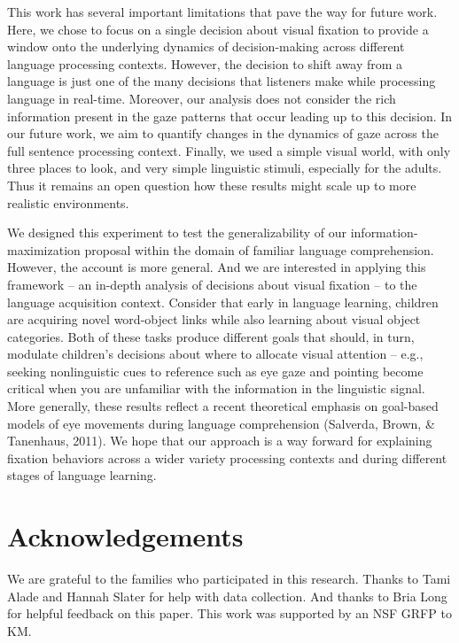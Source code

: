 \documentclass[10pt, letterpaper]{article}
\begin{document}
This work has several important limitations that pave the way for future
work. Here, we chose to focus on a single decision about visual fixation
to provide a window onto the underlying dynamics of decision-making
across different language processing contexts. However, the decision to
shift away from a language is just one of the many decisions that
listeners make while processing language in real-time. Moreover, our
analysis does not consider the rich information present in the gaze
patterns that occur leading up to this decision. In our future work, we
aim to quantify changes in the dynamics of gaze across the full sentence
processing context. Finally, we used a simple visual world, with only
three places to look, and very simple linguistic stimuli, especially for
the adults. Thus it remains an open question how these results might
scale up to more realistic environments.

We designed this experiment to test the generalizability of our
information-maximization proposal within the domain of familiar language
comprehension. However, the account is more general. And we are
interested in applying this framework -- an in-depth analysis of
decisions about visual fixation -- to the language acquisition context.
Consider that early in language learning, children are acquiring novel
word-object links while also learning about visual object categories.
Both of these tasks produce different goals that should, in turn,
modulate children's decisions about where to allocate visual attention
-- e.g., seeking nonlinguistic cues to reference such as eye gaze and
pointing become critical when you are unfamiliar with the information in
the linguistic signal. More generally, these results reflect a recent
theoretical emphasis on goal-based models of eye movements during
language comprehension (Salverda, Brown, \& Tanenhaus, 2011). We hope
that our approach is a way forward for explaining fixation behaviors
across a wider variety processing contexts and during different stages
of language learning.

\section{Acknowledgements}\label{acknowledgements}

We are grateful to the families who participated in this research.
Thanks to Tami Alade and Hannah Slater for help with data collection.
And thanks to Bria Long for helpful feedback on this paper. This work
was supported by an NSF GRFP to KM.
\end{document}

